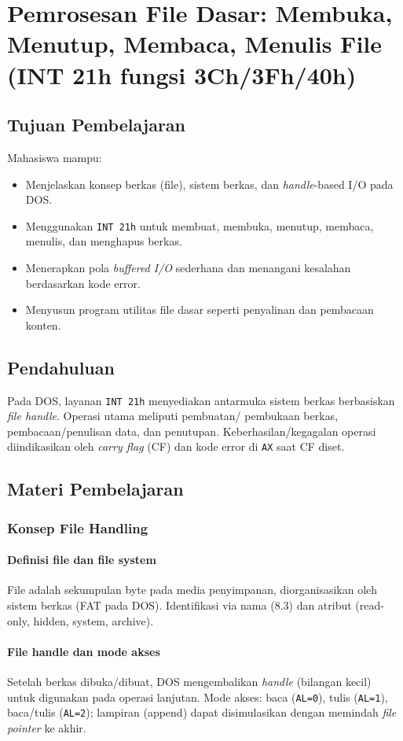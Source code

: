 \chapter{Pemrosesan File Dasar: Membuka, Menutup, Membaca, Menulis File (INT 21h fungsi 3Ch/3Fh/40h)}

\section{Tujuan Pembelajaran}
Mahasiswa mampu:
\begin{itemize}
  \item Menjelaskan konsep berkas (file), sistem berkas, dan \textit{handle}-based I/O pada DOS.
  \item Menggunakan \texttt{INT 21h} untuk membuat, membuka, menutup, membaca, menulis, dan menghapus berkas.
  \item Menerapkan pola \textit{buffered I/O} sederhana dan menangani kesalahan berdasarkan kode error.
  \item Menyusun program utilitas file dasar seperti penyalinan dan pembacaan konten.
\end{itemize}

\section{Pendahuluan}
Pada DOS, layanan \texttt{INT 21h} menyediakan antarmuka sistem berkas berbasiskan \textit{file handle}. Operasi utama meliputi pembuatan/ pembukaan berkas, pembacaan/penulisan data, dan penutupan. Keberhasilan/kegagalan operasi diindikasikan oleh \textit{carry flag} (CF) dan kode error di \texttt{AX} saat CF diset.

\section{Materi Pembelajaran}
\subsection{Konsep File Handling}
\subsubsection{Definisi file dan file system}
File adalah sekumpulan byte pada media penyimpanan, diorganisasikan oleh sistem berkas (FAT pada DOS). Identifikasi via nama (8.3) dan atribut (read-only, hidden, system, archive).

\subsubsection{File handle dan mode akses}
Setelah berkas dibuka/dibuat, DOS mengembalikan \textit{handle} (bilangan kecil) untuk digunakan pada operasi lanjutan. Mode akses: baca (\texttt{AL=0}), tulis (\texttt{AL=1}), baca/tulis (\texttt{AL=2}); lampiran (append) dapat disimulasikan dengan memindah \textit{file pointer} ke akhir.

